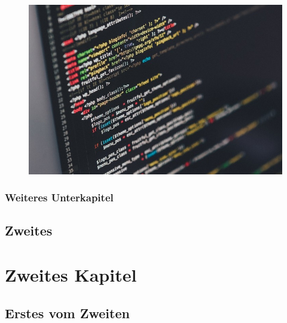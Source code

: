 \begin{figure}
    \centering
    \includegraphics[width=.9\linewidth]{ba_abbildungen/testimage}                      %
\end{figure}

\newpage
\begin{table}
    \centering
\end{table}

\subsection{Weiteres Unterkapitel}       %
\section{Zweites}
\newpage
\chapter{Zweites Kapitel}
\section{Erstes vom Zweiten}

\newpage